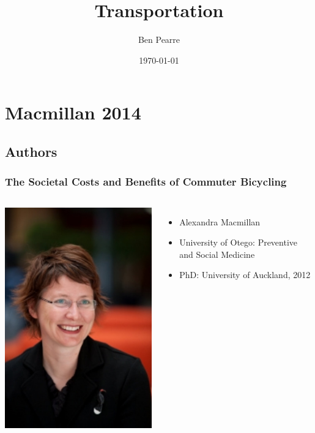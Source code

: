 \documentclass{beamer}
\title[Transportation]{Transportation}
\author{Ben Pearre}
\date{\today}
\begin{document}



\section{Macmillan 2014}

\subsection{Authors}

\begin{frame}
  \frametitle{The Societal Costs and Benefits of Commuter Bicycling}
  \begin{columns}
    \includegraphics[height=0.3\textheight]{AlexMacmillan.jpg}
    \begin{itemize}
    \item Alexandra Macmillan
    \item University of Otego: Preventive and Social Medicine
    \item PhD: University of Auckland, 2012

\end{itemize}
\end{columns}
\end{frame}
\end{document}
